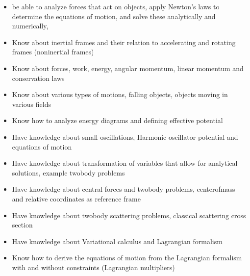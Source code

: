 \documentclass[letterpaper,10pt,english]{sphinxmanual}
\begin{document}
\begin{itemize}
\item {} 
be able to analyze forces that act on objects, apply Newton’s laws to determine the equations of motion, and solve these analytically and numerically,

\item {} 
Know about  inertial frames and their relation to accelerating and rotating frames (non\sphinxhyphen{}inertial frames)

\item {} 
Know about forces, work, energy, angular momentum, linear momentum and conservation laws

\item {} 
Know about  various types of motions, falling objects, objects moving in various fields

\item {} 
Know how to analyze energy diagrams and defining effective potential

\item {} 
Have knowledge about small oscillations, Harmonic oscillator potential and equations of motion

\item {} 
Have knowledge about transformation of variables that allow for analytical solutions, example two\sphinxhyphen{}body problems

\item {} 
Have knowledge about central forces and two\sphinxhyphen{}body problems, center\sphinxhyphen{}of\sphinxhyphen{}mass and relative coordinates as reference frame

\item {} 
Have knowledge about two\sphinxhyphen{}body scattering problems, classical scattering cross section

\item {} 
Have knowledge about Variational calculus and Lagrangian formalism

\item {} 
Know how to derive the equations of motion from the Lagrangian formalism with and without constraints (Lagrangian multipliers)

\end{itemize}
\end{document}
